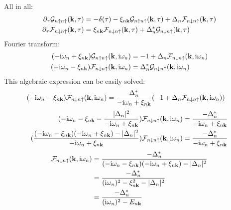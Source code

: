 All in all:
\begin{align}
    \pdif{\tau} \mathcal{G}_{n \uparrow n \uparrow} (\vb{k}, \tau) &= -\delta(\tau) - \xi_{n \vb{k}} \mathcal{G}_{n \uparrow n \uparrow} (\vb{k}, \tau) + \Delta_{n} \mathcal{F}_{n\downarrow n\uparrow} (\vb{k}, \tau) \\
    \pdif{\tau} \mathcal{F}_{n \downarrow n \uparrow} (\vb{k}, \tau) &= \xi_{n \vb{k}} \mathcal{F}_{n \downarrow n \uparrow} (\vb{k}, \tau) + \Delta_{n}^* \mathcal{G}_{n\downarrow n\uparrow} (\vb{k}, \tau)
\end{align}
Fourier transform:
\begin{align}
    (-\mathrm{i} \omega_n + \xi_{n \bm{\mathrm{k}}}) \mathcal{G}_{n \uparrow n \uparrow} (\bm{\mathrm{k}}, \mathrm{i} \omega_n) &= -1 + \Delta_{n} \mathcal{F}_{n\downarrow n\uparrow} (\bm{\mathrm{k}}, \mathrm{i} \omega_n) \\
    (-\mathrm{i} \omega_n - \xi_{n \bm{\mathrm{k}}}) \mathcal{F}_{n \downarrow n \uparrow} (\bm{\mathrm{k}}, \mathrm{i} \omega_n) &= \Delta_{n}^* \mathcal{G}_{n\downarrow n\uparrow} (\bm{\mathrm{k}}, \mathrm{i} \omega_n)
\end{align}
This algebraic expression can be easily solved:
\begin{align}
    (-\mathrm{i} \omega_n - \xi_{n \bm{\mathrm{k}}}) \mathcal{F}_{n \downarrow n \uparrow} (\bm{\mathrm{k}}, \mathrm{i} \omega_n) &= \frac{\Delta_{n}^*}{-\mathrm{i} \omega_n + \xi_{n \bm{\mathrm{k}}}} (-1 + \Delta_{n} \mathcal{F}_{n\downarrow n\uparrow} (\bm{\mathrm{k}}, \mathrm{i} \omega_n))
\end{align}
\begin{align}
    (-\mathrm{i} \omega_n - \xi_{n \bm{\mathrm{k}}} - \frac{\vert\Delta_{n}\vert^2}{-\mathrm{i} \omega_n + \xi_{n \bm{\mathrm{k}}}}) \mathcal{F}_{n \downarrow n \uparrow} (\bm{\mathrm{k}}, \mathrm{i} \omega_n) &= \frac{-\Delta_{n}^*}{-\mathrm{i} \omega_n + \xi_{n \bm{\mathrm{k}}}} \\
    (\frac{(-\mathrm{i} \omega_n - \xi_{n \bm{\mathrm{k}}} )(-\mathrm{i} \omega_n + \xi_{n \bm{\mathrm{k}}}) - \vert\Delta_{n}\vert^2}{-\mathrm{i} \omega_n + \xi_{n \bm{\mathrm{k}}}}) \mathcal{F}_{n \downarrow n \uparrow} (\bm{\mathrm{k}}, \mathrm{i} \omega_n) &= \frac{-\Delta_{n}^*}{-\mathrm{i} \omega_n + \xi_{n \bm{\mathrm{k}}}}
\end{align}
\begin{align}
    \mathcal{F}_{n \downarrow n \uparrow} (\bm{\mathrm{k}}, \mathrm{i} \omega_n) &= \frac{-\Delta_{n}^*}{(-\mathrm{i} \omega_n - \xi_{n \bm{\mathrm{k}}} )(-\mathrm{i} \omega_n + \xi_{n \bm{\mathrm{k}}}) - \vert\Delta_{n}\vert^2} \\
    &= \frac{-\Delta_{n}^*}{(\mathrm{i} \omega_n)^2 - \xi_{n \bm{\mathrm{k}}}^2 - \vert\Delta_{n}\vert^2} \\
    &= \frac{-\Delta_{n}^*}{(\mathrm{i} \omega_n)^2 - E_{n \bm{\mathrm{k}}}}
\end{align}
